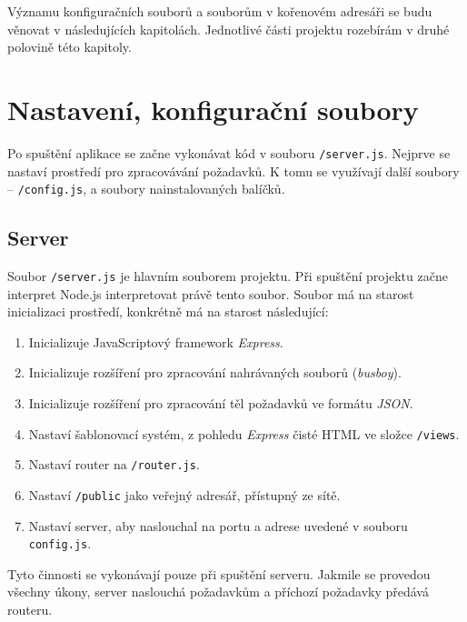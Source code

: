 Významu konfiguračních souborů a souborům v kořenovém adresáři se budu věnovat v následujících kapitolách. Jednotlivé části projektu rozebírám v druhé polovině této kapitoly.

\section{Nastavení, konfigurační soubory}
Po spuštění aplikace se začne vykonávat kód v souboru \texttt{/server.js}. Nejprve se nastaví prostředí pro zpracovávání požadavků. K tomu se využívají další soubory -- \texttt{/config.js},  a soubory nainstalovaných balíčků.

\subsection{Server}
Soubor \texttt{/server.js} je hlavním souborem projektu. Při spuštění projektu začne interpret Node.js interpretovat právě tento soubor. Soubor má na starost inicializaci prostředí, konkrétně má na starost následující:
\begin{enumerate}
\item Inicializuje JavaScriptový framework \textit{Express}.
\item Inicializuje rozšíření pro zpracování nahrávaných souborů (\textit{busboy}).
\item Inicializuje rozšíření pro zpracování těl požadavků ve formátu \textit{JSON}.
\item Nastaví šablonovací systém, z pohledu \textit{Express} čisté HTML ve složce \texttt{/views}.
\item Nastaví router na \texttt{/router.js}.
\item Nastaví \texttt{/public} jako veřejný adresář, přístupný ze sítě.
\item Nastaví server, aby naslouchal na portu a adrese uvedené v souboru \texttt{config.js}.
\end{enumerate}
Tyto činnosti se vykonávají pouze při spuštění serveru. Jakmile se provedou všechny úkony, server naslouchá požadavkům a příchozí požadavky předává routeru.

